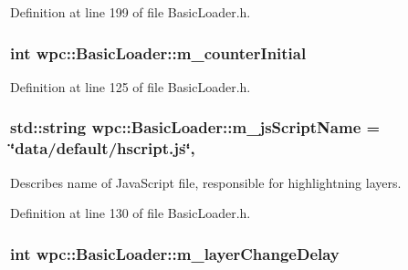 Definition at line 199 of file Basic\-Loader.\-h.

\hypertarget{classwpc_1_1_basic_loader_afc1f23543a23f8f3afbec0b9d6d8837e}{
\subsubsection[{m\-\_\-counter\-Initial}]{\setlength{\rightskip}{0pt plus 5cm}int wpc\-::\-Basic\-Loader\-::m\-\_\-counter\-Initial\hspace{0.3cm}{\ttfamily [private]}}}\label{classwpc_1_1_basic_loader_afc1f23543a23f8f3afbec0b9d6d8837e}


Definition at line 125 of file Basic\-Loader.\-h.

\hypertarget{classwpc_1_1_basic_loader_a2fb7543b8e4b8b11c55727cc12115f83}{
\subsubsection[{m\-\_\-js\-Script\-Name}]{\setlength{\rightskip}{0pt plus 5cm}std\-::string wpc\-::\-Basic\-Loader\-::m\-\_\-js\-Script\-Name = \char`\"{}data/default/hscript.\-js\char`\"{}\hspace{0.3cm}{\ttfamily [static]}, {\ttfamily [private]}}}\label{classwpc_1_1_basic_loader_a2fb7543b8e4b8b11c55727cc12115f83}


Describes name of Java\-Script file, responsible for highlightning layers. 



Definition at line 130 of file Basic\-Loader.\-h.

\hypertarget{classwpc_1_1_basic_loader_a9d5e11507f6111f601016f1b06b2eecd}{
\subsubsection[{m\-\_\-layer\-Change\-Delay}]{\setlength{\rightskip}{0pt plus 5cm}int wpc\-::\-Basic\-Loader\-::m\-\_\-layer\-Change\-Delay\hspace{0.3cm}{\ttfamily [private]}}}\label{classwpc_1_1_basic_loader_a9d5e11507f6111f601016f1b06b2eecd}


